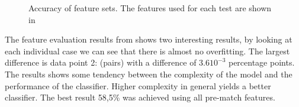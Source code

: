 \begin{figure}[!htb]
  \centering
   \caption{Accuracy of feature sets. The features used for each test are shown in }\label{fig:cluster-feat}
\end{figure}

The feature evaluation results from  shows two interesting results, by looking at each individual case we can see that there is almost no overfitting. The largest difference is data point 2: (pairs) with a difference of $3.610^{-3}$ percentage points. The results shows some tendency between the complexity of the model and the performance of the classifier. Higher complexity in general yields a better classifier. The best result 58,5\% was achieved using all pre-match features.

